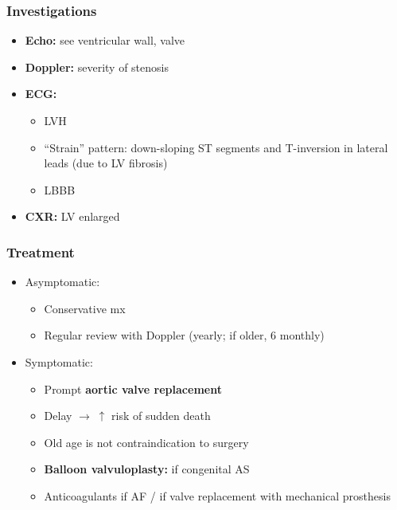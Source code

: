 \documentclass[
  12pt,
]{memoir}
\providecommand{\tightlist}{%
  \setlength{\itemsep}{0pt}\setlength{\parskip}{0pt}}
\begin{document}
\hypertarget{investigations-11}{%
\subsubsection{Investigations}\label{investigations-11}}

\begin{itemize}
\tightlist
\item
  \textbf{Echo:} see ventricular wall, valve
\item
  \textbf{Doppler:} severity of stenosis
\item
  \textbf{ECG:}

  \begin{itemize}
  \tightlist
  \item
    LVH
  \item
    ``Strain'' pattern: down-sloping ST segments and T-inversion in
    lateral leads (due to LV fibrosis)
  \item
    LBBB
  \end{itemize}
\item
  \textbf{CXR:} LV enlarged
\end{itemize}

\hypertarget{treatment-2}{%
\subsubsection{Treatment}\label{treatment-2}}

\begin{itemize}
\tightlist
\item
  Asymptomatic:

  \begin{itemize}
  \tightlist
  \item
    Conservative mx
  \item
    Regular review with Doppler (yearly; if older, 6 monthly)
  \end{itemize}
\item
  Symptomatic:

  \begin{itemize}
  \tightlist
  \item
    Prompt \textbf{aortic valve replacement}
  \item
    Delay \(\rightarrow\;\uparrow\) risk of sudden death
  \item
    Old age is not contraindication to surgery
  \item
    \textbf{Balloon valvuloplasty:} if congenital AS
  \item
    Anticoagulants if AF / if valve replacement with mechanical
    prosthesis
  \end{itemize}
\end{itemize}
\end{document}
